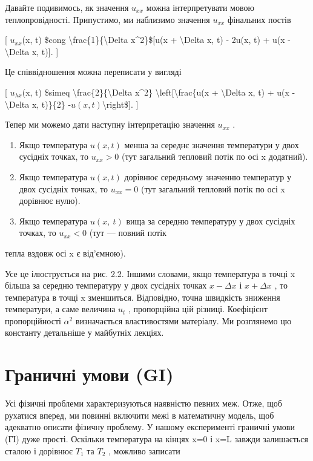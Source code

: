 \documentclass[
]{article}
\begin{document}
Давайте подивимось, як значення \(u_{xx}\) можна інтерпретувати мовою
теплопровідності. Припустимо, ми наблизимо значення \(u_{xx}\) фінальних
постів

{[} \(u_{xx}\)(x, t) \$cong
\textbackslash frac\{1\}\{\textbackslash Delta x\^{}2\}\${[}u(x +
\textbackslash Delta x, t) - 2u(x, t) + u(x - \textbackslash Delta x,
t){]}. {]}

Це співвідношення можна переписати у вигляді

{[} \(u_{\lambda x}\)(x, t) \$simeq
\textbackslash frac\{2\}\{\textbackslash Delta x\^{}2\}
\textbackslash left\([\)\textbackslash frac\{u(x + \textbackslash Delta
x, t) + u(x - \textbackslash Delta x, t)\}\{2\}
-\(u(x, t)\)\textbackslash right\${]}. {]}

Тепер ми можемо дати наступну інтерпретацію значення \(u_{xx}\) .

\begin{enumerate}
\def\labelenumi{\arabic{enumi}.}
\item
  Якщо температура \(u(x, t)\) менша за середнє значення температури у
  двох сусідніх точках, то \(u_{xx} > 0\) (тут загальний тепловий потік
  по осі x додатний).
\item
  Якщо температура \(u(x, t)\) дорівнює середньому значенню температур у
  двох сусідніх точках, то \(u_{xx} = 0\) (тут загальний тепловий потік
  по осі x дорівнює нулю).
\item
  Якщо температура \(u\left(x,\ t\right)\) вища за середню температуру у
  двох сусідніх точках, то \(u_{xx}<0\) (тут --- повний потік
\end{enumerate}

тепла вздовж осі x є від'ємною).

Усе це ілюструється на рис. 2.2. Іншими словами, якщо температура в
точці x більша за середню температуру у двох сусідніх точках
\(x - \Delta x\) і \(x + \Delta x\) , то температура в точці x
зменшиться. Відповідно, точна швидкість зниження температури, а саме
величина \(u_t\) , пропорційна цій різниці. Коефіцієнт пропорційності
\(\alpha^2\) визначається властивостями матеріалу. Ми розглянемо цю
константу детальніше у майбутніх лекціях.

\section{Граничні умови
(GI)}\label{ux433ux440ux430ux43dux438ux447ux43dux456-ux443ux43cux43eux432ux438-gi}

Усі фізичні проблеми характеризуються наявністю певних меж. Отже, щоб
рухатися вперед, ми повинні включити межі в математичну модель, щоб
адекватно описати фізичну проблему. У нашому експерименті граничні умови
(ГІ) дуже прості. Оскільки температура на кінцях x=0 і x=L завжди
залишається сталою і дорівнює \(T_1\) та \(T_2\) , можливо записати
\end{document}

